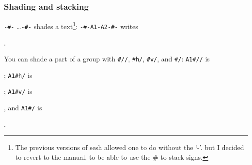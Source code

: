 \documentclass[final]{article}
\begin{document}
\subsubsection{Shading and stacking}

\verb|-#-| \ldots \verb|-#-| shades a text\footnote{The previous
  versions of sesh allowed one to do without the `-'. but I decided to
  revert to the manual, to be able to use the \# to stack signs.}:
\verb/-#-A1-A2-#-/ writes 
\begin{hieroglyph}{\leavevmode {}%
}\end{hieroglyph}.

You can shade a part of a group with \verb.#//., 
\verb.#h/., \verb.#v/., and \verb.#/.:
\verb.A1#//. is 
\begin{hieroglyph}{\leavevmode {}}\end{hieroglyph}; 
\verb.A1#h/. is 
\begin{hieroglyph}{\leavevmode {}}\end{hieroglyph}; 
\verb.A1#v/. is 
\begin{hieroglyph}{\leavevmode {}}\end{hieroglyph}, and 
\verb.A1#/. is 
\begin{hieroglyph}{\leavevmode {}}\end{hieroglyph}.
\end{document}

